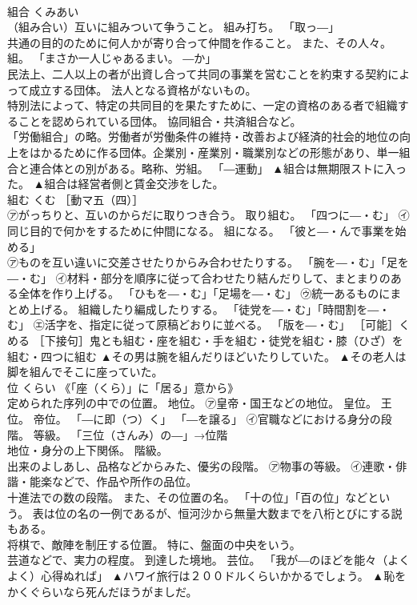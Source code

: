 \documentclass[8pt]{extreport}
\begin{document}
\begin{CJK}{UTF8}{min}
\\	組合	くみあい	
\\	（組み合い）互いに組みついて争うこと。 組み打ち。 「取っ―」 
\\	共通の目的のために何人かが寄り合って仲間を作ること。 また、その人々。 組。 「まさか一人じゃあるまい。 ―か」 
\\	民法上、二人以上の者が出資し合って共同の事業を営むことを約束する契約によって成立する団体。 法人となる資格がないもの。 
\\	特別法によって、特定の共同目的を果たすために、一定の資格のある者で組織することを認められている団体。 協同組合・共済組合など。 
\\	「労働組合」の略。労働者が労働条件の維持・改善および経済的社会的地位の向上をはかるために作る団体。企業別・産業別・職業別などの形態があり、単一組合と連合体との別がある。略称、労組。 「―運動」	▲組合は無期限ストに入った。 ▲組合は経営者側と賃金交渉をした。
\\	組む	くむ	［動マ五（四）］ 
\\	㋐がっちりと、互いのからだに取りつき合う。 取り組む。 「四つに―・む」 ㋑同じ目的で何かをするために仲間になる。 組になる。 「彼と―・んで事業を始める」 
\\	㋐ものを互い違いに交差させたりからみ合わせたりする。 「腕を―・む」「足を―・む」 ㋑材料・部分を順序に従って合わせたり結んだりして、まとまりのある全体を作り上げる。 「ひもを―・む」「足場を―・む」 ㋒統一あるものにまとめ上げる。 組織したり編成したりする。 「徒党を―・む」「時間割を―・む」 ㋓活字を、指定に従って原稿どおりに並べる。 「版を―・む」 ［可能］くめる ［下接句］鬼とも組む・座を組む・手を組む・徒党を組む・膝（ひざ）を組む・四つに組む	▲その男は腕を組んだりほどいたりしていた。 ▲その老人は脚を組んでそこに座っていた。
\\	位	くらい	《「座（くら）」に「居る」意から》 
\\	定められた序列の中での位置。 地位。 ㋐皇帝・国王などの地位。 皇位。 王位。 帝位。 「―に即（つ）く」 「―を譲る」 ㋑官職などにおける身分の段階。 等級。 「三位（さんみ）の―」→位階 
\\	地位・身分の上下関係。 階級。 
\\	出来のよしあし、品格などからみた、優劣の段階。 ㋐物事の等級。 ㋑連歌・俳諧・能楽などで、作品や所作の品位。 
\\	十進法での数の段階。 また、その位置の名。 「十の位」「百の位」などという。 表は位の名の一例であるが、恒河沙から無量大数までを八桁とびにする説もある。 
\\	将棋で、敵陣を制圧する位置。 特に、盤面の中央をいう。 
\\	芸道などで、実力の程度。 到達した境地。 芸位。 「我が―のほどを能々（よくよく）心得ぬれば」	▲ハワイ旅行は２００ドルくらいかかるでしょう。 ▲恥をかくぐらいなら死んだほうがましだ。

\end{CJK}
\end{document}
